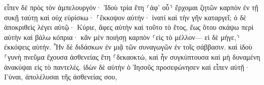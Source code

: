 \documentclass{openreader}
\begin{document}
εἶπεν δὲ πρὸς τὸν ἀμπελουργόν· Ἰδοὺ τρία ἔτη ⸂ἀφ’ οὗ⸃ ἔρχομαι ζητῶν καρπὸν ἐν τῇ συκῇ ταύτῃ καὶ οὐχ εὑρίσκω· ⸀ἔκκοψον αὐτήν· ἱνατί καὶ τὴν γῆν καταργεῖ; 
ὁ δὲ ἀποκριθεὶς λέγει αὐτῷ· Κύριε, ἄφες αὐτὴν καὶ τοῦτο τὸ ἔτος, ἕως ὅτου σκάψω περὶ αὐτὴν καὶ βάλω κόπρια· 
κἂν μὲν ποιήσῃ καρπὸν ⸂εἰς τὸ μέλλον— εἰ δὲ μήγε,⸃ ἐκκόψεις αὐτήν. 
Ἦν δὲ διδάσκων ἐν μιᾷ τῶν συναγωγῶν ἐν τοῖς σάββασιν. 
καὶ ἰδοὺ ⸀γυνὴ πνεῦμα ἔχουσα ἀσθενείας ἔτη ⸀δεκαοκτώ, καὶ ἦν συγκύπτουσα καὶ μὴ δυναμένη ἀνακύψαι εἰς τὸ παντελές. 
ἰδὼν δὲ αὐτὴν ὁ Ἰησοῦς προσεφώνησεν καὶ εἶπεν αὐτῇ· Γύναι, ἀπολέλυσαι τῆς ἀσθενείας σου, 
\end{document}
